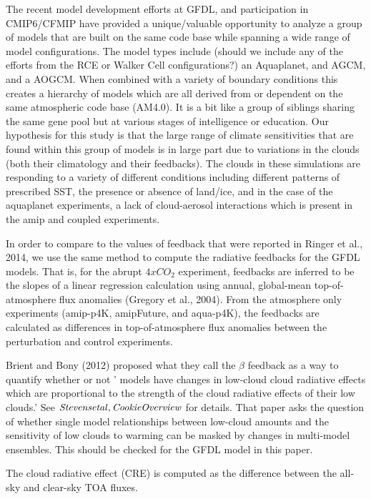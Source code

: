 \documentclass[11pt]{article}   	%
\begin{document}
The recent model development efforts at GFDL, and participation in CMIP6/CFMIP have provided a 
unique/valuable opportunity to analyze a group of models that are built on the same code base while 
spanning a wide range of model configurations.  The model types include (should we include any of the
efforts from the RCE or Walker Cell configurations?) an Aquaplanet, and AGCM, 
and a AOGCM.  When combined with a variety of boundary conditions this creates a hierarchy of
models which are all derived from or dependent on the same atmospheric code base (AM4.0).  It is a 
bit like a group of siblings sharing the same gene pool but at various stages of intelligence or education.      
Our hypothesis for this study is that the large range of climate sensitivities that are found within this 
group of models is in large part due to variations in the clouds (both their climatology and their feedbacks).
The clouds in these simulations are responding to a variety of different conditions including different
patterns of prescribed SST, the presence or absence of land/ice, and in the case of the aquaplanet
experiments, a lack of cloud-aerosol interactions which is present in the amip and coupled experiments.  

In order to compare to the values of feedback that were reported in Ringer et al., 2014, we use the same method 
to compute the radiative feedbacks for the GFDL models.  That is, for the abrupt $4xCO_{2}$ experiment, feedbacks are 
inferred to be the slopes of a linear regression calculation using annual, global-mean top-of-atmosphere flux anomalies 
(Gregory et al., 2004).  From the atmosphere only experiments (amip-p4K, amipFuture, and aqua-p4K), the feedbacks 
are calculated as 
differences in top-of-atmosphere flux anomalies between the perturbation and control experiments.   

Brient and Bony (2012) proposed what they call the $\beta$ feedback as a way to quantify whether or not ' models have 
changes in low-cloud cloud radiative effects which are proportional to the strength of the cloud radiative effects of their
low clouds.'  See $\it{Stevens etal, Cookie Overview}$ for details.   That paper asks the question of whether single 
model relationships between low-cloud amounts and the sensitivity of low clouds to warming can be 
masked by changes in multi-model ensembles.  This should be checked for the GFDL model in this paper.  

The cloud radiative effect (CRE) is computed as the difference between the all-sky and clear-sky TOA fluxes.  
\end{document}
